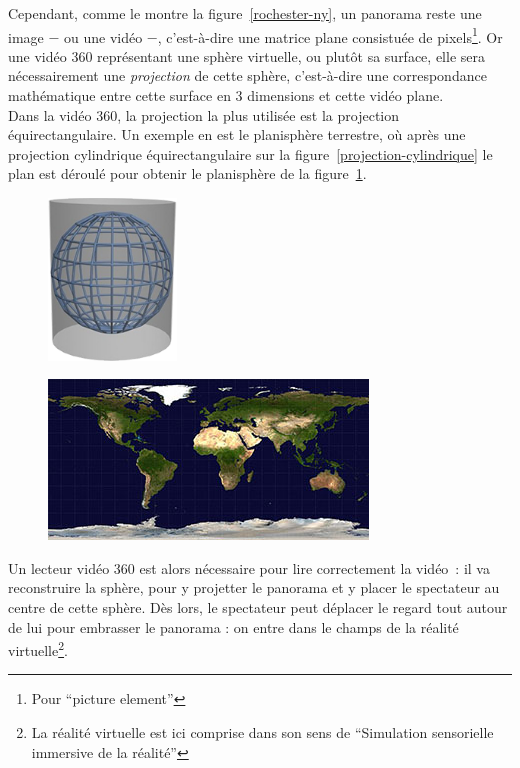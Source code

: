\newline
Cependant, comme le montre la figure~\ref{rochester-ny}, un panorama reste une image
$-$ ou une vidéo $-$, c'est-à-dire une matrice plane consistuée de pixels\footnote{Pour
 \enquote{picture element}}. Or une vidéo 360 représentant une sphère virtuelle, ou
plutôt sa surface, elle sera nécessairement une \emph{projection} de cette sphère, 
c'est-à-dire une correspondance mathématique entre cette surface en 3 dimensions 
et cette vidéo plane\cite{projection-cartographique}.\\
Dans la vidéo 360, la projection la plus utilisée est la projection équirectangulaire\cite{what-is-equirectangular}.
Un exemple en est le planisphère terrestre, où après une projection cylindrique équirectangulaire
sur la figure~\ref{projection-cylindrique} le plan est déroulé pour obtenir le 
planisphère de la figure~\ref{planisphère}.
\begin{figure}
  \centering
  \begin{minipage}[t]{0.35\textwidth}
    \centering
    \includegraphics[width=3.4cm]{images/projection-cylindrique.png}
    \label{projection-cylindrique}
  \end{minipage}%
  \hspace{0.04\textwidth}
  \begin{minipage}[t]{0.6\textwidth}
    \centering
    \includegraphics[width=8.5cm]{images/equirectangular-projection.jpg}
    \label{planisphère}
  \end{minipage}
\end{figure}
\newline
Un lecteur vidéo 360 est alors nécessaire pour lire correctement la vidéo~: 
il va reconstruire la sphère, pour y projetter le panorama et y placer le
spectateur au centre de cette sphère. Dès lors, le spectateur peut déplacer le 
regard tout autour de lui pour embrasser le panorama : on entre dans le champs de 
la réalité virtuelle\footnote{La réalité virtuelle est ici comprise dans son sens
  de \enquote{Simulation sensorielle immersive de la réalité}\cite{definition-rv}}.

